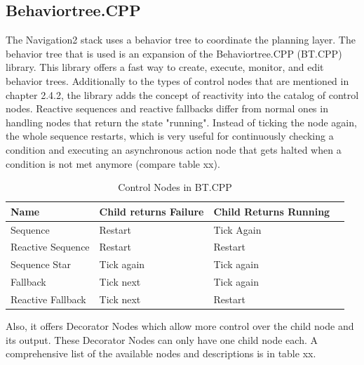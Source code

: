 \subsection{Behaviortree.CPP}
The Navigation2 stack uses a behavior tree to coordinate the planning layer. The behavior tree that is used is an expansion of the Behaviortree.CPP (BT.CPP) library. This library offers a fast way to create, execute, monitor, and edit behavior trees. 
Additionally to the types of control nodes that are mentioned in chapter 2.4.2, the library adds the concept of reactivity into the catalog of control nodes. Reactive sequences and reactive fallbacks differ from normal ones in handling nodes that return the state "running". Instead of ticking the node again, the whole sequence restarts, which is very useful for continuously checking a condition and executing an asynchronous action node that gets halted when a condition is not met anymore (compare table xx). 

\begin{table}[h!]
	\caption{Control Nodes in BT.CPP}
	\begin{tabular}{ | m{} | m{}| m{} | m{} |} 
  	\hline
  	Name & Child returns Failure & Child Returns Running \\ 
  	\hline
  	Sequence & Restart & Tick Again\\ 
  	\hline
  	Reactive Sequence & Restart & Restart \\ 
  	\hline
  	Sequence Star & Tick again & Tick again \\
  	\hline
  	Fallback & Tick next & Tick again\\
  	\hline  	
  	Reactive Fallback & Tick next & Restart \\
  	\hline
	\end{tabular}
\end{table}

Also, it offers Decorator Nodes which allow more control over the child node and its output. These Decorator Nodes can only have one child node each. A comprehensive list of the available nodes and descriptions is in table xx.

